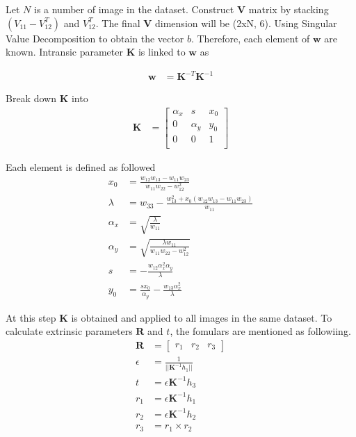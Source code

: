 \documentclass[11pt]{article}
\begin{document}
Let $N$ is a number of image in the dataset. Construct $\mathbf{V}$ matrix by stacking $(V_{11}-V_{12}^T)$ and $V_{12}^T$. The final $\mathbf{V}$ dimension will be (2xN, 6). Using Singular Value Decomposition to obtain the vector $b$. Therefore, each element of $\mathbf{w}$ are known. Intransic parameter $\mathbf{K}$ is linked to $\mathbf{w}$ as 

\begin{align*}
\mathbf{w}  &= \mathbf{K}^{-T} \mathbf{K}^{-1}
\end{align*}

Break down $\mathbf{K}$  into 
\begin{align*}
\mathbf{K}  &= \begin{bmatrix} 
\alpha_x & s & x_0 \\
0 & \alpha_y & y_0 \\
0 & 0 & 1 \\
\end{bmatrix}
\end{align*}

Each element is defined as followed
\begin{align*}
x_0  &= \frac{w_{12}w_{13} - w_{11}w_{23}}{w_{11}w_{22}-w_{12}^2} \\
\lambda  &= w_{33} - \frac{w_{13}^2+x_0(w_{12}w_{13} - w_{11}w_{23})}{w_{11}} \\
\alpha_x &= \sqrt{\frac{\lambda}{w_{11}}} \\
\alpha_y &= \sqrt{\frac{\lambda w_{11}}{w_{11}w_{22}-w_{12}^2}} \\
s &= -\frac{w_{12}\alpha_x^2 \alpha_y}{\lambda} \\
y_0 &= \frac{s x_0}{\alpha_y} - \frac{w_{13}\alpha_x^2}{\lambda}
\end{align*}

At this step $\mathbf{K}$ is obtained and applied to all images in the same dataset. To calculate extrinsic parameters $\mathbf{R}$ and $t$, the fomulars are mentioned as followiing. 
\begin{align*}
\mathbf{R}  &= \begin{bmatrix} r_1 & r_2 & r_3\end{bmatrix} \\
\epsilon &= \frac{1}{||\mathbf{K}^{-1}h_1||} \\ 
t &= \epsilon \mathbf{K}^{-1} h_3 \\
r_1 &= \epsilon \mathbf{K}^{-1} h_1 \\
r_2 &= \epsilon \mathbf{K}^{-1} h_2 \\
r_3 &= r_1 \times r_2
\end{align*}
\end{document}
